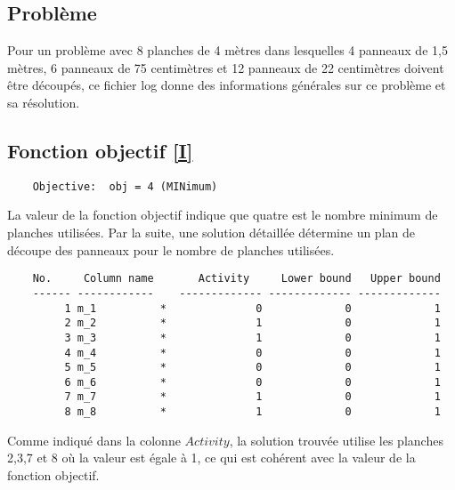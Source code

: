 \documentclass{article}[A4]
\begin{document}
\subsection{Problème}
Pour un problème avec 8 planches de 4 mètres dans lesquelles 4 panneaux 
de 1,5 mètres, 6 panneaux de 75 centimètres et 12 panneaux de 22 
centimètres doivent être découpés, ce fichier log donne des informations
générales sur ce problème et sa résolution.
\subsection{Fonction objectif \ref{I}}
\begin{verbatim}
	Objective:  obj = 4 (MINimum)
\end{verbatim}
La valeur de la fonction objectif indique que quatre est le nombre 
minimum de planches utilisées. Par la suite, une solution détaillée
détermine un plan de découpe des panneaux pour le nombre de planches 
utilisées.
\begin{verbatim}
	No.     Column name       Activity     Lower bound   Upper bound
	------ ------------    ------------- ------------- -------------
	     1 m_1          *              0             0             1 
	     2 m_2          *              1             0             1 
	     3 m_3          *              1             0             1 
	     4 m_4          *              0             0             1 
	     5 m_5          *              0             0             1 
	     6 m_6          *              0             0             1 
	     7 m_7          *              1             0             1 
	     8 m_8          *              1             0             1 

\end{verbatim}
Comme indiqué dans la colonne $Activity$, la solution trouvée utilise 
les planches 2,3,7 et 8 où la valeur est égale à 1, ce qui est cohérent 
avec la valeur de la fonction objectif.
\end{document}
